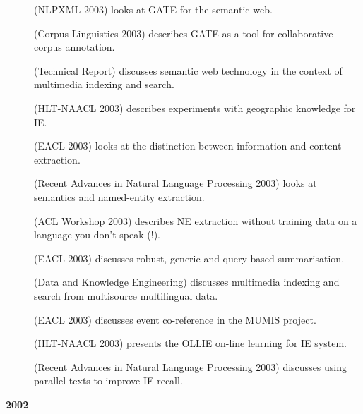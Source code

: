 \begin{description}

\item[\cite{Bon03a}] (NLPXML-2003) looks at GATE for the semantic web.
%
\item[\cite{Cun03a}] (Corpus Linguistics 2003) describes GATE as a tool for
collaborative corpus annotation.
%
\item[\cite{Kir03}] (Technical Report) discusses semantic web technology in
the context of multimedia indexing and search.
%
\item[\cite{Manov03}] (HLT-NAACL 2003) describes experiments with
geographic knowledge for IE.
%
\item[\cite{Maynard03a}] (EACL 2003) looks at the distinction between
information and content extraction.
%
\item[\cite{May03e}] (Recent Advances in Natural Language Processing 2003)
looks at semantics and named-entity extraction.
%
\item[\cite{May03d}] (ACL Workshop 2003) describes NE extraction without
training data on a language you don't speak (!).
%
\item[\cite{Saggion03c}] (EACL 2003) discusses robust, generic and
query-based summarisation.
%
\item[\cite{Saggion&al03}] (Data and Knowledge Engineering) discusses
multimedia indexing and search from multisource multilingual data.
%
\item[\cite{Saggion03b}] (EACL 2003) discusses event co-reference in the
MUMIS project.
%
\item[\cite{Tab03a}] (HLT-NAACL 2003) presents the OLLIE on-line learning
for IE system.
%
\item[\cite{Wood03}] (Recent Advances in Natural Language Processing 2003)
discusses using parallel texts to improve IE recall.
%
\end{description}

\textbf{2002}

